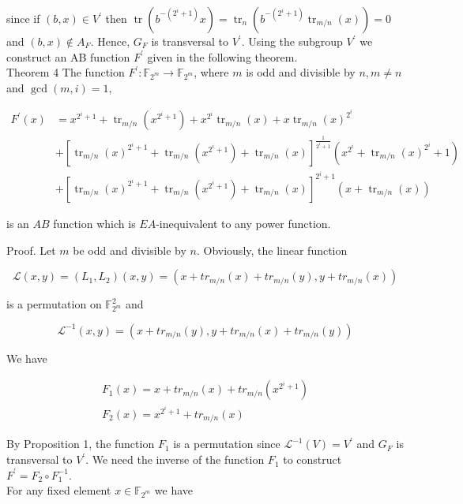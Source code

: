 \documentclass[10pt]{article}
\begin{document}
since if $(b, x) \in V^{\prime}$ then $\operatorname{tr}\left(b^{-\left(2^{i}+1\right)} x\right)=\operatorname{tr}_{n}\left(b^{-\left(2^{i}+1\right)} \operatorname{tr}_{m / n}(x)\right)=0$ and $(b, x) \notin A_{F}$. Hence, $G_{F}$ is transversal to $V^{\prime}$. Using the subgroup $V^{\prime}$ we construct an AB function $F^{\prime}$ given in the following theorem.\\
Theorem 4 The function $F^{\prime}: \mathbb{F}_{2^{m}} \rightarrow \mathbb{F}_{2^{m}}$, where $m$ is odd and divisible by $n, m \neq n$ and $\operatorname{gcd}(m, i)=1$,

$$
\begin{aligned}
F^{\prime}(x) & =x^{2^{i}+1}+\operatorname{tr}_{m / n}\left(x^{2^{i}+1}\right)+x^{2^{i}} \operatorname{tr}_{m / n}(x)+x \operatorname{tr}_{m / n}(x)^{2^{i}} \\
& +\left[\operatorname{tr}_{m / n}(x)^{2^{i}+1}+\operatorname{tr}_{m / n}\left(x^{2^{i}+1}\right)+\operatorname{tr}_{m / n}(x)\right]^{\frac{1}{2^{i}+1}}\left(x^{2^{i}}+\operatorname{tr}_{m / n}(x)^{2^{i}}+1\right) \\
& +\left[\operatorname{tr}_{m / n}(x)^{2^{i}+1}+\operatorname{tr}_{m / n}\left(x^{2^{i}+1}\right)+\operatorname{tr}_{m / n}(x)\right]^{2^{i}+1}\left(x+\operatorname{tr}_{m / n}(x)\right)
\end{aligned}
$$

is an $A B$ function which is $E A$-inequivalent to any power function.

Proof. Let $m$ be odd and divisible by $n$. Obviously, the linear function

$$
\mathcal{L}(x, y)=\left(L_{1}, L_{2}\right)(x, y)=\left(x+t r_{m / n}(x)+t r_{m / n}(y), y+t r_{m / n}(x)\right)
$$

is a permutation on $\mathbb{F}_{2^{m}}^{2}$ and

$$
\mathcal{L}^{-1}(x, y)=\left(x+t r_{m / n}(y), y+t r_{m / n}(x)+t r_{m / n}(y)\right)
$$

We have

$$
\begin{gathered}
F_{1}(x)=x+t r_{m / n}(x)+t r_{m / n}\left(x^{2^{i}+1}\right) \\
F_{2}(x)=x^{2^{i}+1}+t r_{m / n}(x)
\end{gathered}
$$

By Proposition 1, the function $F_{1}$ is a permutation since $\mathcal{L}^{-1}(V)=V^{\prime}$ and $G_{F}$ is transversal to $V^{\prime}$. We need the inverse of the function $F_{1}$ to construct $F^{\prime}=F_{2} \circ F_{1}^{-1}$.\\
For any fixed element $x \in \mathbb{F}_{2^{m}}$ we have
\end{document}
